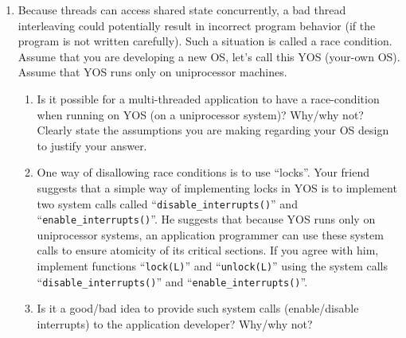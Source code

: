 \begin{enumerate}
\item Because threads can access shared state concurrently, a bad thread interleaving could
potentially result in incorrect program behavior (if the program is not written carefully). Such a
situation is called a race condition. Assume that you are developing a new OS, let’s call this YOS (your-own OS). Assume that YOS runs only on uniprocessor machines.
\begin{enumerate}
\item Is it possible for a multi-threaded application to have a race-condition when running on
YOS (on a uniprocessor system)? Why/why not? Clearly state the assumptions you are
making regarding your OS design to justify your answer.
\item One way of disallowing race conditions is to use “locks”. Your friend
suggests that a
simple way of implementing locks in YOS is to implement two system calls called
“{\tt disable\_interrupts()}” and “{\tt enable\_interrupts()}”. He suggests
that because YOS runs
only on uniprocessor systems, an application programmer can use these system calls to
ensure atomicity of its critical sections. If you agree with him, implement functions
“{\tt lock(L)}” and “{\tt unlock(L)}” using the system calls
“{\tt disable\_interrupts()}” and “{\tt enable\_interrupts()}”. 
\item Is it a good/bad idea to provide such system calls (enable/disable interrupts) to the
application developer? Why/why not?
\end{enumerate}
\end{enumerate}

